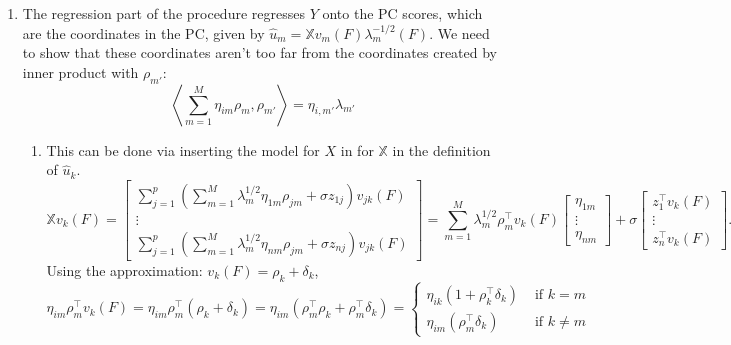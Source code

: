 \documentclass[11pt]{article}
\newcommand{\X}{\mathbb{X}}
\begin{document}
\begin{enumerate}
\item The regression part of the procedure regresses $Y$ onto the PC scores, which are the coordinates in the PC, given by $\hat{u}_m = \X v_m(F) \lambda_m^{-1/2}(F)$.  We need to show that these coordinates aren't too far from the coordinates created by inner product with $\rho_{m'}$:
\begin{equation}
\left\langle \sum_{m=1}^M \eta_{im} \rho_{m}, \rho_{m'} \right\rangle = \eta_{i,m'} \lambda_{m'}
\end{equation}
\begin{enumerate}
\item This can be done via inserting the model for $X$ in for $\X$ in the definition of $\hat{u}_k$.
\begin{equation}
\X v_k(F) 
=
\begin{bmatrix} 
\sum_{j=1}^p \left(\sum_{m=1}^M \lambda_m^{1/2}\eta_{1m} \rho_{jm} + \sigma z_{1j}\right) v_{jk}(F) \\
\vdots \\
\sum_{j=1}^p \left(\sum_{m=1}^M \lambda_m^{1/2}\eta_{nm} \rho_{jm} + \sigma z_{nj}\right)v_{jk}(F)
\end{bmatrix}
=
\sum_{m=1}^M
\lambda_m^{1/2}\rho_{m}^\top v_k(F) 
\begin{bmatrix} 
 \eta_{1m} \\
\vdots \\
 \eta_{nm} 
\end{bmatrix}
+
\sigma
\begin{bmatrix} 
z_{1}^{\top}v_{k}(F) \\
\vdots \\
 z_{n}^{\top}v_{k}(F) 
\end{bmatrix}.
\end{equation}
Using the approximation: $v_k(F) = \rho_k + \delta_k$,
\begin{equation}
\eta_{im} \rho_{m}^\top v_k(F)  = \eta_{im} \rho_{m}^\top (\rho_k + \delta_k) 
= 
\eta_{im} (\rho_{m}^\top \rho_k + \rho_{m}^\top\delta_k)
=
\begin{cases}
\eta_{ik}(1+\rho_{k}^\top\delta_k) & \textrm{ if } k = m \\
\eta_{im}(\rho_{m}^\top\delta_k) & \textrm{ if } k \neq m
\end{cases}
\end{equation}


\end{enumerate}
\end{enumerate}
\end{document}
